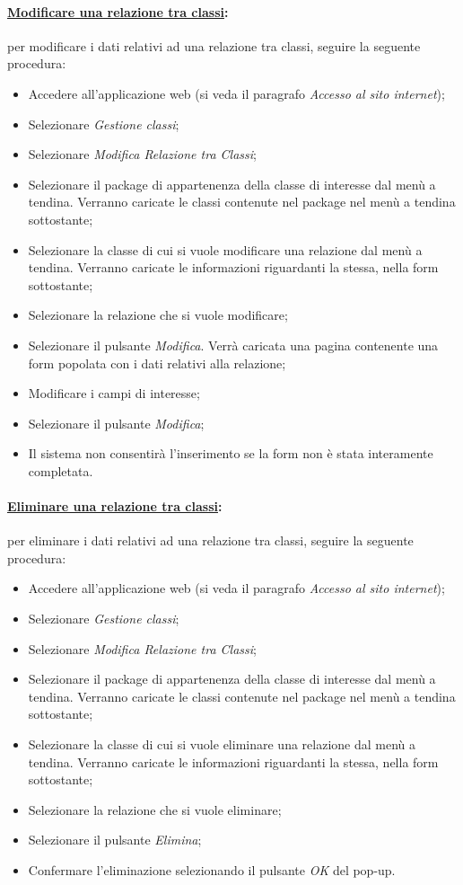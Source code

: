 \paragraph{\underline{Modificare una relazione tra classi}:}
per modificare i dati relativi ad una relazione tra classi, seguire la seguente procedura:
\begin{itemize}
\item Accedere all'applicazione web (si veda il paragrafo \textit{Accesso al sito internet});
\item Selezionare \textit{Gestione classi};
\item Selezionare \textit{Modifica Relazione tra Classi};
\item Selezionare il package\g{} di appartenenza della classe di interesse dal menù a tendina. Verranno caricate le classi contenute nel package\g{} nel menù a tendina sottostante;
\item Selezionare la classe di cui si vuole modificare una relazione dal menù a tendina. Verranno caricate le informazioni riguardanti la stessa, nella form sottostante;
\item Selezionare la relazione che si vuole modificare;
\item Selezionare il pulsante \textit{Modifica}. Verrà caricata una pagina contenente una form popolata con i dati relativi alla relazione;
\item Modificare i campi di interesse;
\item Selezionare il pulsante \textit{Modifica};
\item Il sistema non consentirà l'inserimento se la form non è stata interamente completata.
\end{itemize}

\paragraph{\underline{Eliminare una relazione tra classi}:}
per eliminare i dati relativi ad una relazione tra classi, seguire la seguente procedura:
\begin{itemize}
\item Accedere all'applicazione web (si veda il paragrafo \textit{Accesso al sito internet});
\item Selezionare \textit{Gestione classi};
\item Selezionare \textit{Modifica Relazione tra Classi};
\item Selezionare il package\g{} di appartenenza della classe di interesse dal menù a tendina. Verranno caricate le classi contenute nel package\g{} nel menù a tendina sottostante;
\item Selezionare la classe di cui si vuole eliminare una relazione dal menù a tendina. Verranno caricate le informazioni riguardanti la stessa, nella form sottostante;
\item Selezionare la relazione che si vuole eliminare;
\item Selezionare il pulsante \textit{Elimina};
\item Confermare l'eliminazione selezionando il pulsante \textit{OK} del pop-up.
\end{itemize}

